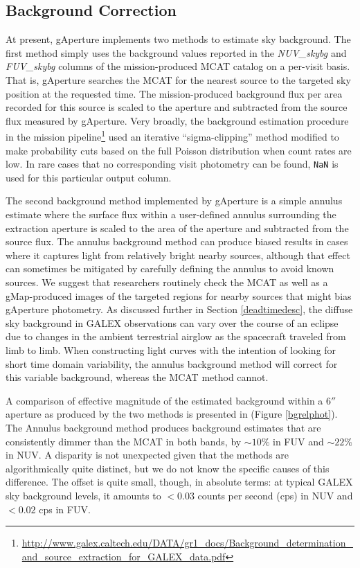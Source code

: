 \documentclass[iop]{emulateapj}
\begin{document}
\subsection{Background Correction}
\label{bgcorr}
At present, gAperture implements two methods to estimate sky background. The first method simply uses the background values reported in the \emph{NUV\_skybg} and \emph{FUV\_skybg} columns of the mission-produced MCAT catalog on a per-visit basis. That is, gAperture searches the MCAT for the nearest source to the targeted sky position at the requested time. The mission-produced background flux per area recorded for this source is scaled to the aperture and subtracted from the source flux measured by gAperture. Very broadly, the background estimation procedure in the mission pipeline\footnote{\url{http://www.galex.caltech.edu/DATA/gr1_docs/Background_determination_and_source_extraction_for_GALEX_data.pdf}} used an iterative ``sigma-clipping'' method modified to make probability cuts based on the full Poisson distribution when count rates are low. In rare cases that no corresponding visit photometry can be found, \texttt{NaN} is used for this particular output column.

The second background method implemented by gAperture is a simple annulus estimate where the surface flux within a user-defined annulus surrounding the extraction aperture is scaled to the area of the aperture and subtracted from the source flux. The annulus background method can produce biased results in cases where it captures light from relatively bright nearby sources, although that effect can sometimes be mitigated by carefully defining the annulus to avoid known sources. We suggest that researchers routinely check the MCAT as well as a gMap-produced images of the targeted regions for nearby sources that might bias gAperture photometry. As discussed further in Section \ref{deadtimedesc}, the diffuse sky background in GALEX observations can vary over the course of an eclipse due to changes in the ambient terrestrial airglow as the spacecraft traveled from limb to limb. When constructing light curves with the intention of looking for short time domain variability, the annulus background method will correct for this variable background, whereas the MCAT method cannot.

A comparison of effective magnitude of the estimated background within a $6''$ aperture as produced by the two methods is presented in (Figure \ref{bgrelphot}). The Annulus background method produces background estimates that are consistently dimmer than the MCAT in both bands, by $\sim 10\%$ in FUV and $\sim 22\%$ in NUV. A disparity is not unexpected given that the methods are algorithmically quite distinct, but we do not know the specific causes of this difference. The offset is quite small, though, in absolute terms: at typical GALEX sky background levels, it amounts to $< 0.03$ counts per second (cps) in NUV and $< 0.02$ cps in FUV.
\end{document}
